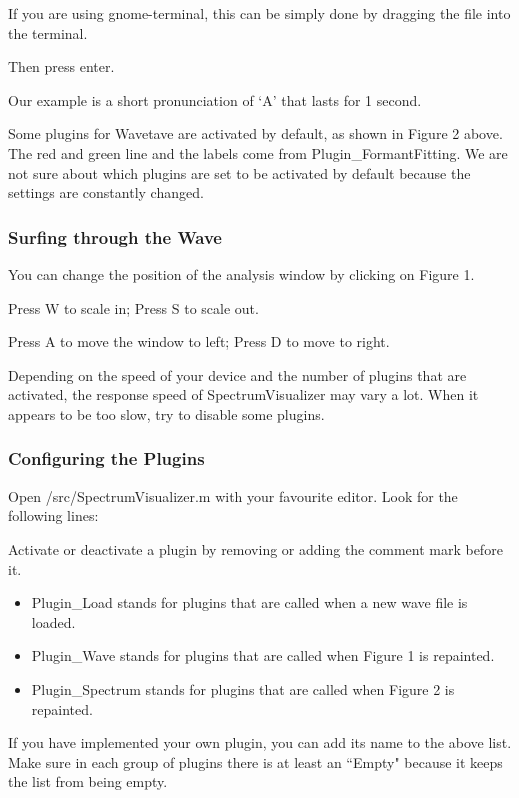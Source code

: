         If you are using gnome-terminal, this can be simply done by dragging the file into the terminal.

        Then press enter.
        
        Our example is a short pronunciation of `A' that lasts for 1 second.
        
        \newpage
        
        
        Some plugins for Wavetave are activated by default, as shown in Figure 2 above. The red and green line and the labels come from Plugin\_FormantFitting. We are not sure about which plugins are set to be activated by default because the settings are constantly changed.
        
        \subsubsection{Surfing through the Wave}\indent
        
        You can change the position of the analysis window by clicking on Figure 1.
        
        Press W to scale in; Press S to scale out.
        
        Press A to move the window to left; Press D to move to right.
        
        Depending on the speed of your device and the number of plugins that are activated, the response speed of SpectrumVisualizer may vary a lot. When it appears to be too slow, try to disable some plugins.
        
        \subsubsection{Configuring the Plugins}\indent
        
        Open /src/SpectrumVisualizer.m with your favourite editor. Look for the following lines:
        
        \lstset{language = octave, tabsize = 8}
        
        
        Activate or deactivate a plugin by removing or adding the comment mark before it.
        
        \begin{itemize}
                \item Plugin\_Load stands for plugins that are called when a new wave file is loaded.
                \item Plugin\_Wave stands for plugins that are called when Figure 1 is repainted.
                \item Plugin\_Spectrum stands for plugins that are called when Figure 2 is repainted.
        \end{itemize}
        
        If you have implemented your own plugin, you can add its name to the above list. Make sure in each group of plugins there is at least an ``Empty" because it keeps the list from being empty.

